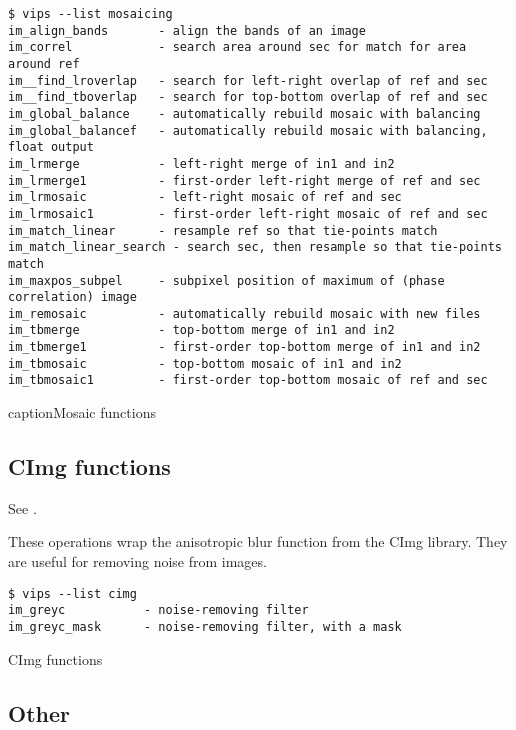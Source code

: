 \begin{fig2}
\begin{verbatim}
$ vips --list mosaicing
im_align_bands       - align the bands of an image
im_correl            - search area around sec for match for area around ref
im__find_lroverlap   - search for left-right overlap of ref and sec
im__find_tboverlap   - search for top-bottom overlap of ref and sec
im_global_balance    - automatically rebuild mosaic with balancing
im_global_balancef   - automatically rebuild mosaic with balancing, float output
im_lrmerge           - left-right merge of in1 and in2
im_lrmerge1          - first-order left-right merge of ref and sec
im_lrmosaic          - left-right mosaic of ref and sec
im_lrmosaic1         - first-order left-right mosaic of ref and sec
im_match_linear      - resample ref so that tie-points match
im_match_linear_search - search sec, then resample so that tie-points match
im_maxpos_subpel     - subpixel position of maximum of (phase correlation) image
im_remosaic          - automatically rebuild mosaic with new files
im_tbmerge           - top-bottom merge of in1 and in2
im_tbmerge1          - first-order top-bottom merge of in1 and in2
im_tbmosaic          - top-bottom mosaic of in1 and in2
im_tbmosaic1         - first-order top-bottom mosaic of ref and sec
\end{verbatim}
caption{Mosaic functions}
\label{fg:mosaicing}
\end{fig2}

\subsection{CImg functions}

See .

These operations wrap the anisotropic blur function from the CImg library.
They are useful for removing noise from images.

\begin{fig2}
\begin{verbatim}
$ vips --list cimg
im_greyc           - noise-removing filter
im_greyc_mask      - noise-removing filter, with a mask
\end{verbatim}
\caption{CImg functions}
\label{fg:cimg}
\end{fig2}

\subsection{Other}

